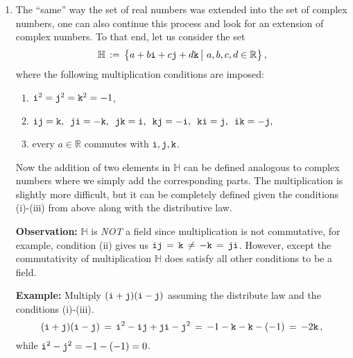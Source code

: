 \documentclass[11pt,table]{article}
\newcommand{\<}			{\langle}
\renewcommand{\>}      		{\rangle}
\newcommand{\bH}		{\mathbb{H}}
\newcommand{\bR}		{\mathbb{R}}
\begin{document}
\begin{enumerate}
\begin{enumerate}[\rm (a)]
\begin{proof}
\end{proof}

\end{enumerate} 


\medskip
\item 
The ``same'' way the set of real numbers 
was extended into the set of complex numbers, 
one can also continue this process and look 
for an extension of complex numbers. 
To that end, let us consider the set 
\begin{equation} \label{eq:quat-def}
\bH \, := \, 
\big\{ 
a + b {\tt i} + c {\tt j} + d {\tt k}  \, \big| \,\, 
a, b, c, d \in \bR 
\big\} \, ,
\end{equation} 
where the following multiplication conditions are imposed: 
\begin{enumerate}[\rm (i)] 
\item 
$ {\tt i}^2 = {\tt j}^2 ={\tt k}^2 = -1$,

\item 
${\tt i}{\tt j}={\tt k}, \,\,\, 
{\tt j}{\tt i}=-{\tt k}, \, \,\,
{\tt j}{\tt k}={\tt i}, \, \,\,
{\tt k}{\tt j}=-{\tt i}, \, \,\,
{\tt k}{\tt i}={\tt j}, \, \,\,
{\tt i}{\tt k}=-{\tt j},$

\item 
every $a\in \bR$ commutes with ${\tt i}, {\tt j}, {\tt k}$.
\end{enumerate} 

Now the addition of two elements in $\bH$ can be defined 
analogous to complex numbers where we simply 
add the corresponding parts. 
The multiplication is slightly more difficult, 
but it can be completely defined given the conditions 
(i)-(iii) from above along with the distributive law. 

\medskip

{\bf Observation:} 
$\bH$ is {\em NOT} a field since multiplication is not commutative, for example, 
condition (ii) gives us $
{\tt i}{\tt j} \, = \, {\tt k} \, \ne \,  -{\tt k} \,=\, {\tt j}{\tt i}$. 
However, except the commutativity of multiplication $\bH$ does satisfy 
all other conditions to be a field. 

\medskip

{\bf Example:} 
Multiply $({\tt i}+{\tt j})({\tt i}-{\tt j})$ assuming the distribute law 
and the conditions (i)-(iii). 
\[
({\tt i}+{\tt j})({\tt i}-{\tt j}) 
\, = \, 
{\tt i}^2 - {\tt i}{\tt j} + {\tt j}{\tt i}-{\tt j}^2 
\, = \, 
-1-{\tt k}-{\tt k}-(-1) 
\, = \, 
-2{\tt k} \, , 
\]
while ${\tt i}^2 - {\tt j}^2 = -1 - (-1) = 0$.


\end{enumerate}
\end{document}
